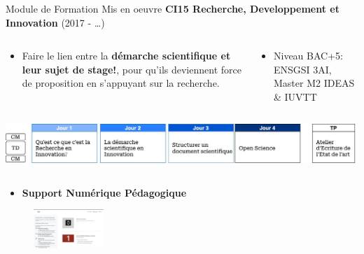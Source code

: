 \documentclass[
  11pt,
  ignorenonframetext,
  aspectratio=169,
  c]{beamer}
\providecommand{\tightlist}{%
  \setlength{\itemsep}{0pt}\setlength{\parskip}{0pt}}\usepackage{longtable,booktabs,array}
\begin{document}
\begin{frame}[t]{Module de Formation Mis en oeuvre}
\protect\hypertarget{module-de-formation-mis-en-oeuvre}{}
\textbf{CI15 Recherche, Developpement et Innovation} \hfill (2017 -
\ldots)

\begin{columns}[T]
\begin{column}[c]{0.5\textwidth}
\scriptsize

\begin{itemize}
\tightlist
\item
  Faire le lien entre la \textbf{démarche scientifique et leur sujet de
  stage!}, pour qu'ils deviennent force de proposition en s'appuyant sur
  la recherche.
\end{itemize}
\end{column}

\begin{column}[c]{0.5\textwidth}
\scriptsize

\begin{itemize}
\tightlist
\item
  Niveau BAC+5: ENSGSI 3AI, Master M2 IDEAS \& IUVTT
\end{itemize}
\end{column}
\end{columns}

\includegraphics{figures/slides/Ensegnement-CI15.jpg}

\begin{columns}[T]
\begin{column}[T]{0.5\textwidth}
\footnotesize

\begin{itemize}
\tightlist
\item
  \textbf{Support Numérique Pédagogique}
\end{itemize}

\begin{figure}

{\centering \includegraphics[width=1.04167in,height=\textheight]{figures/slides/CI15-web.png}

}

\end{figure}


\end{column}
\end{columns}
\end{frame}
\end{document}

